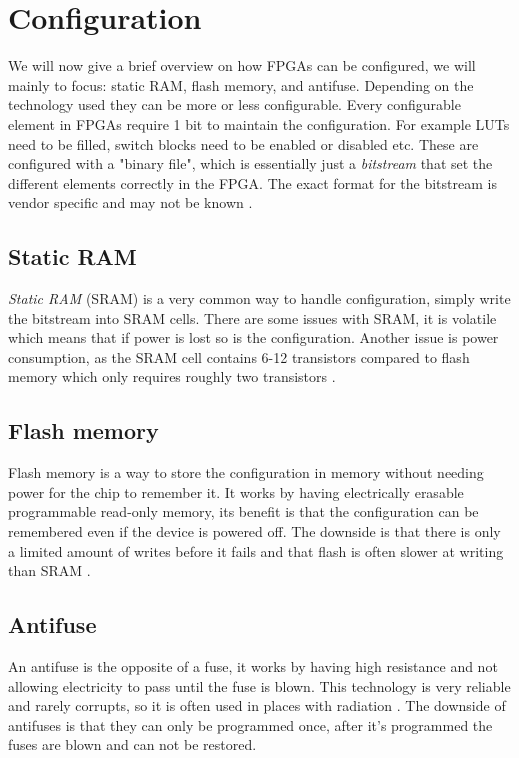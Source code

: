 \section{Configuration}

We will now give a brief overview on how FPGAs can be configured, we will
mainly to focus: static RAM, flash memory, and antifuse. Depending on the
technology used they can be more or less configurable. Every configurable
element in FPGAs require 1 bit to maintain the configuration. For example LUTs
need to be filled, switch blocks need to be enabled or disabled etc. These are
configured with a "binary file", which is essentially just a \textit{bitstream}
that set the different elements correctly in the FPGA. The exact format for the
bitstream is vendor specific and may not be known
\citep{ScottHauckAndreDeHon5}.

\subsection{Static RAM}

\textit{Static RAM} (SRAM) is a very common way to handle configuration,
simply write the bitstream into SRAM cells. There are some issues with SRAM, it
is volatile which means that if power is lost so is the configuration. Another
issue is power consumption, as the SRAM cell contains 6-12 transistors compared
to flash memory which only requires roughly two transistors
\citep{HideharuAmano8}.

\subsection{Flash memory}

Flash memory is a way to store the configuration in memory without needing
power for the chip to remember it. It works by having electrically erasable
programmable read-only memory, its benefit is that the configuration can be
remembered even if the device is powered off. The downside is that there is
only a limited amount of writes before it fails and that flash is often slower
at writing than SRAM \citep{M.MorrisMano3}.

\subsection{Antifuse}

An antifuse is the opposite of a fuse, it works by having high resistance and
not allowing electricity to pass until the fuse is blown. This technology is
very reliable and rarely corrupts, so it is often used in places with radiation
\citep[Ch. 1]{ScottHauckAndreDeHon5}. The downside of antifuses is that they
can only be programmed once, after it's programmed the fuses are blown and can
not be restored.
